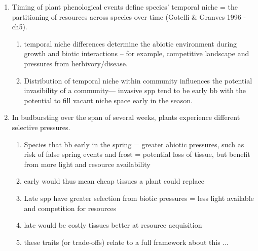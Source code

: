\documentclass{article}
\begin{document}
\begin{enumerate}
\item Timing of plant phenological events define species' temporal niche = the partitioning of resources across species over time (Gotelli \& Granves 1996 - ch5). %
\begin{enumerate} 
\item temporal niche differences determine the abiotic environment during growth and biotic interactions -- for example, competitive landscape and pressures from herbivory/disease. %
\item Distribution of temporal niche within community influences the potential invasibility of a community--- invasive spp tend to be early bb with the potential to fill vacant niche space early in the season. %

\end{enumerate}

\item In budbursting over the span of several weeks, plants experience different selective pressures.  %
\begin{enumerate}
\item Species that bb early in the spring = greater abiotic pressures, such as risk of false spring events and frost = potential loss of tissue, but benefit from more light and resource availability
\item early would thus mean cheap tissues a plant could replace
\item Late spp have greater selection from biotic pressures = less light available and competition for resources 
\item late would be costly tissues better at resource acquisition
\item these traits (or trade-offs) relate to a full framework about this ... 
\end{enumerate}


\end{enumerate}
\end{document}
